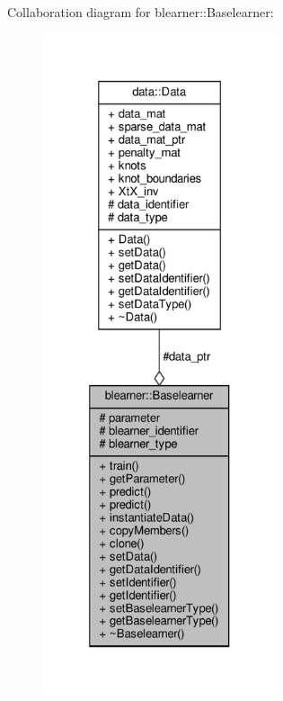 Collaboration diagram for blearner\+:\+:Baselearner\+:\nopagebreak
\begin{figure}[H]
\begin{center}
\leavevmode
\includegraphics[height=550pt]{classblearner_1_1_baselearner__coll__graph}
\end{center}
\end{figure}
